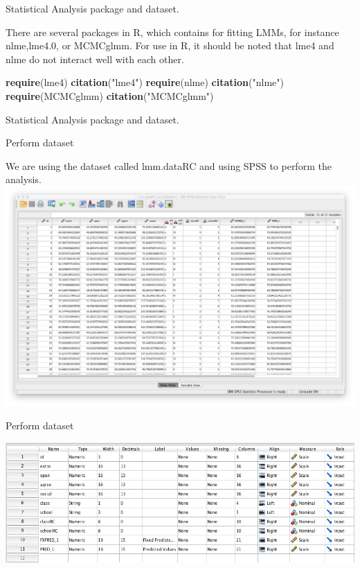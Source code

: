 \documentclass[ignorenonframetext,]{beamer}
\newenvironment{Shaded}{\begin{snugshade}}{\end{snugshade}}
\newcommand{\KeywordTok}[1]{\textcolor[rgb]{0.13,0.29,0.53}{\textbf{#1}}}
\newcommand{\StringTok}[1]{\textcolor[rgb]{0.31,0.60,0.02}{#1}}
\newcommand{\NormalTok}[1]{#1}
\begin{document}
\begin{frame}[fragile]{Statistical Analysis package and dataset.}

There are several packages in R, which contains for fitting LMMs, for
instance nlme,lme4.0, or MCMCglmm. For use in R, it should be noted that
lme4 and nlme do not interact well with each other.

\begin{Shaded}
\begin{Highlighting}[]
\KeywordTok{require}\NormalTok{(lme4)}
\KeywordTok{citation}\NormalTok{(}\StringTok{"lme4"}\NormalTok{)}
\KeywordTok{require}\NormalTok{(nlme)}
\KeywordTok{citation}\NormalTok{(}\StringTok{"nlme"}\NormalTok{)}
\KeywordTok{require}\NormalTok{(MCMCglmm)}
\KeywordTok{citation}\NormalTok{(}\StringTok{"MCMCglmm"}\NormalTok{)}
\end{Highlighting}
\end{Shaded}

\end{frame}

\begin{frame}{Statistical Analysis package and dataset.}

\end{frame}

\begin{frame}{Perform dataset}

We are using the dataset called lmm.dataRC and using SPSS to perform the
analysis. \includegraphics{Dataset1.jpeg}\\

\end{frame}

\begin{frame}{Perform dataset}

\includegraphics{Dataset2.jpeg}\\

\end{frame}
\end{document}

